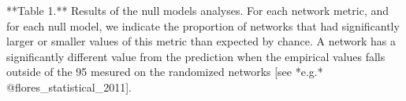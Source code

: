 **Table 1.** Results of the null models analyses. For each network metric, and
for each null model, we indicate the proportion of networks that had
significantly larger or smaller values of this metric than expected by chance.
A network has a significantly different value from the prediction when the
empirical values falls outside of the 95%
mesured on the randomized networks [see *e.g.* @flores_statistical_2011].
